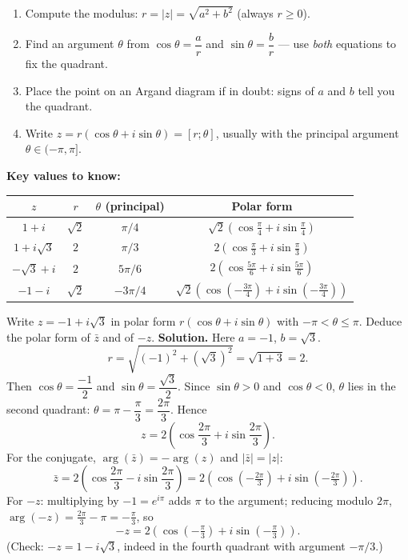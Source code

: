 \documentclass[11pt]{article}
\newcommand{\cle}[1]{{\popxbold\color{popdark}#1}}
\begin{document}
\begin{methode}
\begin{enumerate}
\item Compute the \cle{modulus}: $r = |z| = \sqrt{a^2 + b^2}$ (always $r \geq 0$).
\item Find an \cle{argument} $\theta$ from $\cos\theta = \dfrac{a}{r}$ and $\sin\theta = \dfrac{b}{r}$ — use \emph{both} equations to fix the quadrant.
\item Place the point on an Argand diagram if in doubt: signs of $a$ and $b$ tell you the quadrant.
\item Write $z = r(\cos\theta + i\sin\theta) = [r; \theta]$, usually with the principal argument $\theta \in (-\pi, \pi]$.
\end{enumerate}
\textbf{Key values to know:}
\begin{center}
\begin{tabular}{|c|c|c|c|}\hline
$z$ & $r$ & $\theta$ (principal) & Polar form \\ \hline
$1 + i$ & $\sqrt{2}$ & $\pi/4$ & $\sqrt{2}(\cos\frac{\pi}{4}+i\sin\frac{\pi}{4})$ \\ \hline
$1 + i\sqrt{3}$ & $2$ & $\pi/3$ & $2(\cos\frac{\pi}{3}+i\sin\frac{\pi}{3})$ \\ \hline
$-\sqrt{3} + i$ & $2$ & $5\pi/6$ & $2(\cos\frac{5\pi}{6}+i\sin\frac{5\pi}{6})$ \\ \hline
$-1 - i$ & $\sqrt{2}$ & $-3\pi/4$ & $\sqrt{2}(\cos(-\frac{3\pi}{4})+i\sin(-\frac{3\pi}{4}))$ \\ \hline
\end{tabular}
\end{center}
\end{methode}

\begin{exoresolu}
Write $z = -1 + i\sqrt{3}$ in polar form $r(\cos\theta + i\sin\theta)$ with $-\pi < \theta \leq \pi$. Deduce the polar form of $\bar{z}$ and of $-z$.
\tcblower
\textbf{Solution.} Here $a = -1$, $b = \sqrt{3}$.
\[ r = \sqrt{(-1)^2 + (\sqrt{3})^2} = \sqrt{1 + 3} = 2. \]
Then $\cos\theta = \dfrac{-1}{2}$ and $\sin\theta = \dfrac{\sqrt{3}}{2}$. Since $\sin\theta > 0$ and $\cos\theta < 0$, $\theta$ lies in the second quadrant: $\theta = \pi - \dfrac{\pi}{3} = \dfrac{2\pi}{3}$. Hence
\[ z = 2\left(\cos\frac{2\pi}{3} + i\sin\frac{2\pi}{3}\right). \]
For the conjugate, $\arg(\bar{z}) = -\arg(z)$ and $|\bar{z}| = |z|$:
\[ \bar{z} = 2\left(\cos\frac{2\pi}{3} - i\sin\frac{2\pi}{3}\right) = 2\left(\cos\left(-\tfrac{2\pi}{3}\right) + i\sin\left(-\tfrac{2\pi}{3}\right)\right). \]
For $-z$: multiplying by $-1 = e^{i\pi}$ adds $\pi$ to the argument; reducing modulo $2\pi$, $\arg(-z) = \tfrac{2\pi}{3} - \pi = -\tfrac{\pi}{3}$, so
\[ -z = 2\left(\cos\left(-\tfrac{\pi}{3}\right) + i\sin\left(-\tfrac{\pi}{3}\right)\right). \]
(Check: $-z = 1 - i\sqrt{3}$, indeed in the fourth quadrant with argument $-\pi/3$.)
\end{exoresolu}
\end{document}

